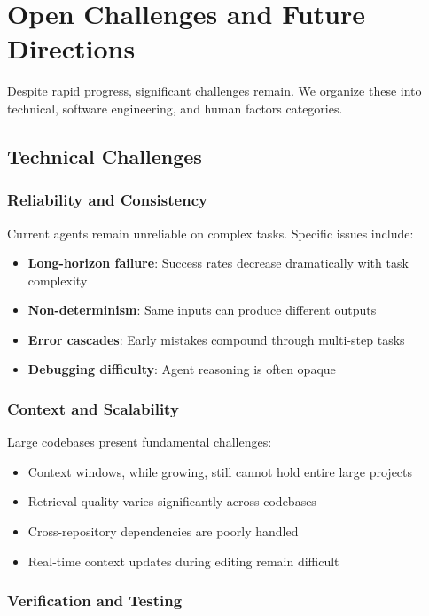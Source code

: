 \section{Open Challenges and Future Directions}
\label{sec:challenges}

Despite rapid progress, significant challenges remain. We organize these into technical, software engineering, and human factors categories.

\subsection{Technical Challenges}

\subsubsection{Reliability and Consistency}

Current agents remain unreliable on complex tasks. Specific issues include:
\begin{itemize}
    \item \textbf{Long-horizon failure}: Success rates decrease dramatically with task complexity
    \item \textbf{Non-determinism}: Same inputs can produce different outputs
    \item \textbf{Error cascades}: Early mistakes compound through multi-step tasks
    \item \textbf{Debugging difficulty}: Agent reasoning is often opaque
\end{itemize}

\subsubsection{Context and Scalability}

Large codebases present fundamental challenges:
\begin{itemize}
    \item Context windows, while growing, still cannot hold entire large projects
    \item Retrieval quality varies significantly across codebases
    \item Cross-repository dependencies are poorly handled
    \item Real-time context updates during editing remain difficult
\end{itemize}

\subsubsection{Verification and Testing}

